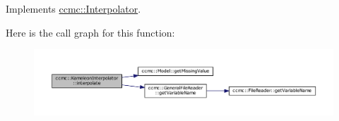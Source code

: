 Implements \hyperlink{classccmc_1_1_interpolator_aa6b272bd53630020d92938ec1e5cfad9}{ccmc\-::\-Interpolator}.



Here is the call graph for this function\-:\nopagebreak
\begin{figure}[H]
\begin{center}
\leavevmode
\includegraphics[width=350pt]{classccmc_1_1_kameleon_interpolator_a510590ccb55b491c9105a9c5db91cd42_cgraph}
\end{center}
\end{figure}




